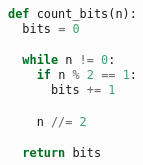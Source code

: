 \begin{lstlisting}[language=Python,caption={Python example of complexity},label={lst:sample_python},showstringspaces=false]
def count_bits(n):
  bits = 0

  while n != 0:
    if n % 2 == 1:
      bits += 1

    n //= 2

  return bits
\end{lstlisting}
